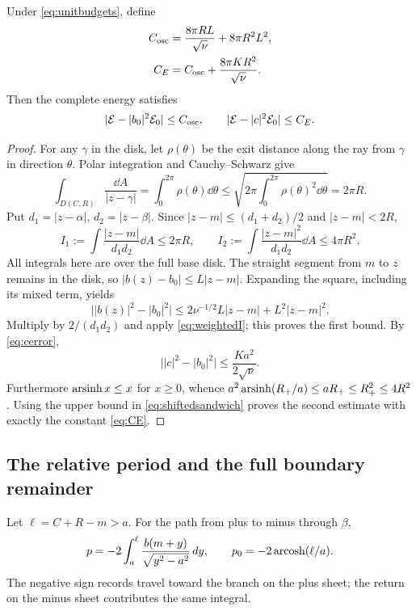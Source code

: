 \begin{theorem}\label{thm:remainder}
Under \eqref{eq:unitbudgets}, define
\begin{align}
 C_{\mathrm{osc}}&=\frac{8\pi RL}{\sqrt\nu}+8\pi R^2L^2,\label{eq:Cosc}\\
 C_E&=C_{\mathrm{osc}}+\frac{8\pi KR^2}{\sqrt\nu}.\label{eq:CE}
\end{align}
Then the complete energy satisfies
\begin{equation}\label{eq:energyremainders}
 |\mathcal E-|b_0|^2\mathcal E_0|\le C_{\mathrm{osc}},\qquad
 |\mathcal E-|c|^2\mathcal E_0|\le C_E.
\end{equation}
\end{theorem}
\begin{proof}
For any $\gamma$ in the disk, let $\rho(\theta)$ be the exit distance
along the ray from $\gamma$ in direction $\theta$. Polar integration
and Cauchy--Schwarz give
\[
 \int_{D(C,R)}\frac{\dd A}{|z-\gamma|}
 =\int_0^{2\pi}\rho(\theta)\dd\theta
 \le\sqrt{2\pi\int_0^{2\pi}\rho(\theta)^2\dd\theta}=2\pi R.
\]
Put $d_1=|z-\alpha|$, $d_2=|z-\beta|$. Since
$|z-m|\le(d_1+d_2)/2$ and $|z-m|<2R$,
\begin{equation}\label{eq:weightedI}
 I_1:=\int\frac{|z-m|}{d_1d_2}\dd A\le2\pi R,
 \qquad
 I_2:=\int\frac{|z-m|^2}{d_1d_2}\dd A\le4\pi R^2.
\end{equation}
All integrals here are over the full base disk. The straight segment
from $m$ to $z$ remains in the disk, so $|b(z)-b_0|\le L|z-m|$.
Expanding the square, including its mixed term, yields
\[
 \big||b(z)|^2-|b_0|^2\big|
 \le2\nu^{-1/2}L|z-m|+L^2|z-m|^2.
\]
Multiply by $2/(d_1d_2)$ and apply \eqref{eq:weightedI}; this proves
the first bound. By \eqref{eq:cerror},
\[
 \big||c|^2-|b_0|^2\big|\le\frac{Ka^2}{2\sqrt\nu}.
\]
Furthermore $\operatorname{arsinh} x\le x$ for $x\ge0$, whence
$a^2\operatorname{arsinh}(R_+/a)\le aR_+\le R_+^2\le4R^2$.
Using the upper bound in \eqref{eq:shiftedsandwich} proves the second
estimate with exactly the constant \eqref{eq:CE}.
\end{proof}

\subsection{The relative period and the full boundary remainder}
Let $\ell=C+R-m>a$. For the path from plus to minus through $\beta$,
\begin{equation}\label{eq:preal}
 p=-2\int_a^\ell\frac{b(m+y)}{\sqrt{y^2-a^2}}\,d y,
 \qquad p_0=-2\operatorname{arcosh}(\ell/a).
\end{equation}
The negative sign records travel toward the branch on the plus sheet;
the return on the minus sheet contributes the same integral.

